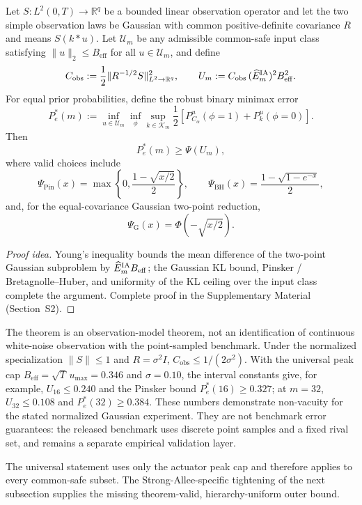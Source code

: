 \begin{theorem}
\label{thm:T20}
Let $S:L^2(0,T)\to\mathbb R^q$ be a bounded linear observation operator and let the two simple observation laws be Gaussian with common positive-definite covariance $R$ and means $S(k*u)$.  Let $\mathcal U_m$ be any admissible common-safe input class satisfying $\|u\|_2\le B_{\mathrm{eff}}$ for all $u\in\mathcal U_m$, and define
\[
C_{\mathrm{obs}}:=\frac12\|R^{-1/2}S\|_{L^2\to\mathbb R^q}^2,
\qquad
U_m:=C_{\mathrm{obs}}\,(\widehat E_m^{\rm IA})^2B_{\mathrm{eff}}^2.
\]
For equal prior probabilities, define the robust binary minimax error
\[
P_e^*(m):=
\inf_{u\in\mathcal U_m}\inf_{\phi}
\sup_{k\in\mathcal K_m}
\frac12\left[
P_{C_\alpha}^u(\phi=1)+P_k^u(\phi=0)
\right].
\]
Then
\[
P_e^*(m)\ge \Psi(U_m),
\]
where valid choices include
\[
\Psi_{\mathrm{Pin}}(x)=\max\!\left\{0,\frac{1-\sqrt{x/2}}{2}\right\},
\qquad
\Psi_{\mathrm{BH}}(x)=\frac{1-\sqrt{1-e^{-x}}}{2},
\]
and, for the equal-covariance Gaussian two-point reduction,
\[
\Psi_{\mathrm{G}}(x)=\Phi(-\sqrt{x/2}).
\]
\end{theorem}
\begin{proof}[Proof idea]
Young's inequality bounds the mean difference of the two-point Gaussian subproblem by $\widehat E_m^{\rm IA} B_{\mathrm{eff}}$; the Gaussian KL bound, Pinsker / Bretagnolle--Huber, and uniformity of the KL ceiling over the input class complete the argument. Complete proof in the Supplementary Material (Section~S2).
\end{proof}

The theorem is an observation-model theorem, not an identification of continuous white-noise observation with the point-sampled benchmark.  Under the normalized specialization $\|S\|\le1$ and $R=\sigma^2I$, $C_{\mathrm{obs}}\le1/(2\sigma^2)$.  With the universal peak cap $B_{\mathrm{eff}}=\sqrt{T}\,u_{\max}=0.346$ and $\sigma=0.10$, the interval constants give, for example, $U_{16}\le0.240$ and the Pinsker bound $P_e^*(16)\ge0.327$; at $m=32$, $U_{32}\le0.108$ and $P_e^*(32)\ge0.384$.  These numbers demonstrate non-vacuity for the stated normalized Gaussian experiment.  They are not benchmark error guarantees: the released benchmark uses discrete point samples and a fixed rival set, and remains a separate empirical validation layer.

The universal statement uses only the actuator peak cap and therefore applies to every common-safe subset.  The Strong-Allee-specific tightening of the next subsection supplies the missing theorem-valid, hierarchy-uniform outer bound.

